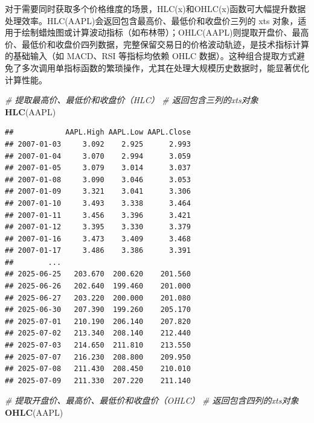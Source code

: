 \documentclass[]{ctexbook}
\newenvironment{Shaded}{\begin{snugshade}}{\end{snugshade}}
\newcommand{\CommentTok}[1]{\textcolor[rgb]{0.56,0.35,0.01}{\textit{#1}}}
\newcommand{\FunctionTok}[1]{\textcolor[rgb]{0.13,0.29,0.53}{\textbf{#1}}}
\newcommand{\NormalTok}[1]{#1}
\begin{document}
对于需要同时获取多个价格维度的场景，HLC(x)和OHLC(x)函数可大幅提升数据处理效率。HLC(AAPL)会返回包含最高价、最低价和收盘价三列的 xts 对象，适用于绘制蜡烛图或计算波动指标（如布林带）；OHLC(AAPL)则提取开盘价、最高价、最低价和收盘价四列数据，完整保留交易日的价格波动轨迹，是技术指标计算的基础输入（如 MACD、RSI 等指标均依赖 OHLC 数据）。这种组合提取方式避免了多次调用单指标函数的繁琐操作，尤其在处理大规模历史数据时，能显著优化计算性能。

\begin{Shaded}
\begin{Highlighting}[]
\CommentTok{\# 提取最高价、最低价和收盘价（HLC）}
\CommentTok{\# 返回包含三列的xts对象}
\FunctionTok{HLC}\NormalTok{(AAPL)}
\end{Highlighting}
\end{Shaded}

\begin{verbatim}
##            AAPL.High AAPL.Low AAPL.Close
## 2007-01-03     3.092    2.925      2.993
## 2007-01-04     3.070    2.994      3.059
## 2007-01-05     3.079    3.014      3.037
## 2007-01-08     3.090    3.046      3.053
## 2007-01-09     3.321    3.041      3.306
## 2007-01-10     3.493    3.338      3.464
## 2007-01-11     3.456    3.396      3.421
## 2007-01-12     3.395    3.330      3.379
## 2007-01-16     3.473    3.409      3.468
## 2007-01-17     3.486    3.386      3.391
##        ...                              
## 2025-06-25   203.670  200.620    201.560
## 2025-06-26   202.640  199.460    201.000
## 2025-06-27   203.220  200.000    201.080
## 2025-06-30   207.390  199.260    205.170
## 2025-07-01   210.190  206.140    207.820
## 2025-07-02   213.340  208.140    212.440
## 2025-07-03   214.650  211.810    213.550
## 2025-07-07   216.230  208.800    209.950
## 2025-07-08   211.430  208.450    210.010
## 2025-07-09   211.330  207.220    211.140
\end{verbatim}

\begin{Shaded}
\begin{Highlighting}[]
\CommentTok{\# 提取开盘价、最高价、最低价和收盘价（OHLC）}
\CommentTok{\# 返回包含四列的xts对象}
\FunctionTok{OHLC}\NormalTok{(AAPL)}
\end{Highlighting}
\end{Shaded}
\end{document}
